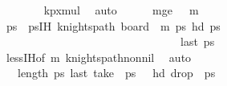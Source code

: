 \begin{isabellebody}
\ \ \ \ \ \ \isamarkupfalse%
\ kp{\isacharunderscore}{\kern0pt}{}xm{\isacharunderscore}{\kern0pt}ul\ \isamarkupfalse%
\ auto\isanewline
\ \ \ \ \isamarkupfalse%
\ m{\isacharunderscore}{\kern0pt}ge{\isacharcolon}{\kern0pt}\ {\isachardoublequoteopen}{}\ {\isasymle}\ m{\isacharminus}{\kern0pt}{}{\isachardoublequoteclose}\ \isanewline
\ \ \ \ \isamarkupfalse%
\ \isamarkupfalse%
\ ps\ \ psIH{\isacharcolon}{\kern0pt}\ {\isachardoublequoteopen}knights{\isacharunderscore}{\kern0pt}path\ {\isacharparenleft}{\kern0pt}board\ {}\ {\isacharparenleft}{\kern0pt}m{\isacharminus}{\kern0pt}{}{\isacharparenright}{\kern0pt}{\isacharparenright}{\kern0pt}\ ps\ {\isachardoublequoteopen}hd\ ps\ {\isacharequal}{\kern0pt}\ {\isacharparenleft}{\kern0pt}{}{\isacharcomma}{\kern0pt}{}{\isacharparenright}{\kern0pt}{\isachardoublequoteclose}\ \isanewline
\ \ \ \ \ \ \ \ \ \ \ \ \ \ \ \ \ \ \ \ \ \ \ \ \ \ \ \ \ \ \ \ {\isachardoublequoteopen}last\ ps\ {\isacharequal}{\kern0pt}\ {\isacharparenleft}{\kern0pt}{}{\isacharcomma}{\kern0pt}{}{\isacharparenright}{\kern0pt}{\isachardoublequoteclose}\isanewline
\ \ \ \ \ \ \isamarkupfalse%
\ less{\isachardot}{\kern0pt}IH{\isacharbrackleft}{\kern0pt}of\ {\isachardoublequoteopen}m{\isacharminus}{\kern0pt}{}{\isachardoublequoteclose}{\isacharbrackright}{\kern0pt}\ knights{\isacharunderscore}{\kern0pt}path{\isacharunderscore}{\kern0pt}non{\isacharunderscore}{\kern0pt}nil\ \isamarkupfalse%
\ auto\isanewline
\isanewline
\ \ \ \ \isamarkupfalse%
\ {\isachardoublequoteopen}{}{}\ {\isacharless}{\kern0pt}\ length\ {\isacharquery}{\kern0pt}ps\ {\isachardoublequoteopen}last\ {\isacharparenleft}{\kern0pt}take\ {}{}\ {\isacharquery}{\kern0pt}ps\ {\isacharequal}{\kern0pt}\ {\isacharparenleft}{\kern0pt}{}{\isacharcomma}{\kern0pt}{}{\isacharparenright}{\kern0pt}{\isachardoublequoteclose}\ {\isachardoublequoteopen}hd\ {\isacharparenleft}{\kern0pt}drop\ {}{}\ {\isacharquery}{\kern0pt}ps\ {\isacharequal}{\kern0pt}\ {\isacharparenleft}{\kern0pt}{}{\isacharcomma}{\kern0pt}{}{\isacharparenright}{\kern0pt}{\isachardoublequoteclose}\ \isamarkupfalse%

\end{isabellebody}
